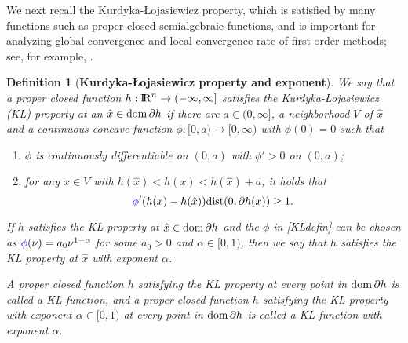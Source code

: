 \documentclass[10pt]{article}
\numberwithin{equation}{section}
\newtheorem{definition}{Definition}[section]
\def\R{{\rm I\!R}}
\def\d{{\rm dist}}
\def\dom{{\rm dom}\,}
\begin{document}
We next recall the Kurdyka-{\L}ojasiewicz property, which is satisfied by many functions such as proper closed semialgebraic functions, and is important for analyzing global convergence and local convergence rate of first-order methods; see, for example, \cite{AtBo09,AtBR10,AtBS13,BoST14,LiPong18}.
\begin{definition}[{{\bf Kurdyka-{\L}ojasiewicz property and exponent}}]
We say that a proper closed function $h:\R^n\to (-\infty, \infty]$ satisfies the Kurdyka-{\L}ojasiewicz (KL) property at an $\hat{x}\in\dom\partial h$ if there are $a\in(0,\infty]$, a neighborhood $V$ of $\hat{x}$ and a continuous concave function {\color {blue} $\phi:[0,a)\to [0, \infty)$ } with {\color {blue} $\phi(0) = 0$} such that
\begin{enumerate}[{\rm (i)}]
  \item {\color {blue} $\phi$} is continuously differentiable on $(0, a)$ with {\color {blue} $\phi' >0$} on $(0, a)$;
  \item for any $x\in V$ with $h(\hat{x}) < h(x) < h(\hat{x}) + a$, it holds that
      \begin{equation}\label{KLdefin}
      {\color {blue} \phi}'(h(x) - h(\hat{x}))\d(0, \partial h(x)) \geq 1.
      \end{equation}
\end{enumerate}
If $h$ satisfies the KL property at $\hat{x}\in\dom\partial h$ and the {\color {blue} $\phi$} in \eqref{KLdefin} can be chosen as ${\color {blue} \phi}(\nu) = a_0\nu^{1 - \alpha}$ for some $a_0 > 0$ and $\alpha\in [0, 1)$, then we say that $h$ satisfies the KL property at $\hat{x}$ with exponent $\alpha$.

A proper closed function $h$ satisfying the KL property at every point in $\dom\partial h$ is called a KL function, and a proper closed function $h$ satisfying the KL property with exponent $\alpha\in[0,1)$ at every point in $\dom\partial h$ is called a KL function with exponent $\alpha$.
\end{definition}
\end{document}
